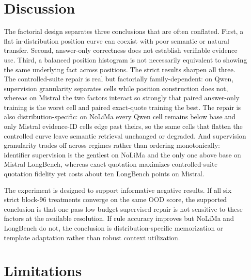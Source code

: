 \documentclass[11pt]{article}
\begin{document}
\section{Discussion}

The factorial design separates three conclusions that are often conflated. First, a flat in-distribution position curve can coexist with poor semantic or natural transfer. Second, answer-only correctness does not establish verifiable evidence use. Third, a balanced position histogram is not necessarily equivalent to showing the same underlying fact across positions. The strict results sharpen all three. The controlled-suite repair is real but factorially family-dependent: on Qwen, supervision granularity separates cells while position construction does not, whereas on Mistral the two factors interact so strongly that paired answer-only training is the worst cell and paired exact-quote training the best. The repair is also distribution-specific: on NoLiMa every Qwen cell remains below base and only Mistral evidence-ID cells edge past theirs, so the same cells that flatten the controlled curve leave semantic retrieval unchanged or degraded. And supervision granularity trades off across regimes rather than ordering monotonically: identifier supervision is the gentlest on NoLiMa and the only one above base on Mistral LongBench, whereas exact quotation maximizes controlled-suite quotation fidelity yet costs about ten LongBench points on Mistral.

The experiment is designed to support informative negative results. If all six strict block-96 treatments converge on the same OOD score, the supported conclusion is that one-pass low-budget supervised repair is not sensitive to these factors at the available resolution. If rule accuracy improves but NoLiMa and LongBench do not, the conclusion is distribution-specific memorization or template adaptation rather than robust context utilization.

\section{Limitations}
\end{document}
